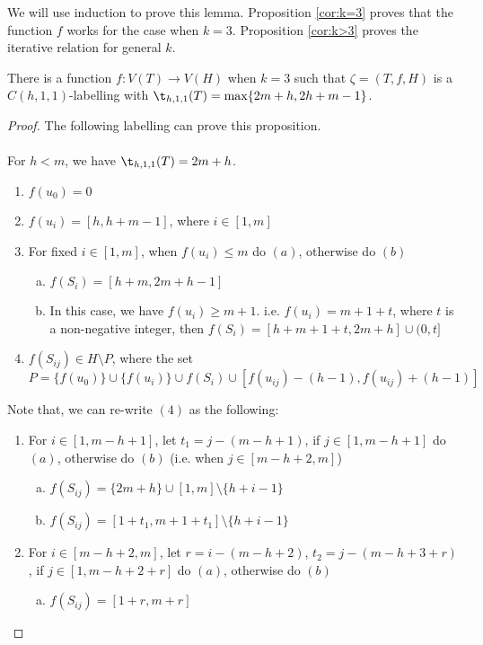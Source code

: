 We will use induction to prove this lemma. Proposition \ref{cor:k=3} proves that the function $f$ works for the case when $k = 3$. Proposition \ref{cor:k>3} proves the iterative relation for general $k$. 
\begin{proposition}
\label{cor:k=3}
There is a function $f: V(T) \rightarrow V(H)$ when $k = 3$ such that $\zeta = (T, f, H)$ is a $C(h,1,1)$-labelling with $\t_{h,1,1}(T) =\max\{2m+h, 2h+m-1\}$. 
\end{proposition}
\begin{proof} 
The following labelling can prove this proposition.  
\\
\\
For $h < m$, we have $\t_{h,1,1}(T) = 2m+h$. 
\begin{enumerate}[(1)]
\item $f(u_0) = 0$ 
\item $f(u_i) = [h, h+m-1]$, where $i \in [1,m]$ 
\item For fixed $i \in [1,m]$, when $f(u_i) \le m$ do $(a)$, otherwise do $(b)$
\begin{enumerate}[(a)]
\item $f(S_i) = [h+m, 2m+h-1]$
\item In this case, we have $f(u_i) \ge m+1$. i.e. $f(u_i) = m+1+t$, where $t$ is a non-negative integer, then $f(S_i) = [h+m+1+t, 2m+h] \cup (0, t]$
\end{enumerate}
\item $f(S_{ij}) \in H \setminus P$, where the set $P =  \{f(u_0)\} \cup \{f(u_i)\} \cup f(S_i) \cup [f(u_{ij}) - (h-1), f(u_{ij}) + (h-1)]$
\end{enumerate}
Note that, we can re-write $(4)$ as the following:
\begin{enumerate}[(4.1)]
\item For $i \in [1,m-h+1]$, let $t_1 = j - (m-h+1)$, if $j \in [1,m-h+1]$ do $(a)$, otherwise do $(b)$ (i.e. when $ j \in [m-h+2, m]$)
\begin{enumerate}[(a)]
\item $f(S_{ij}) = \{2m+h\} \cup [1,m] \setminus \{h+i-1\}$
\item $f(S_{ij}) = [1+t_1,   m+1+t_1] \setminus \{h+i-1\}$
\end{enumerate}
\item For $i \in [m-h+2, m]$, let $r = i - (m-h+2)$, $t_2 = j - (m-h+3+r)$, if $j \in [1, m-h+2+r]$ do $(a)$, otherwise do $(b)$
\begin{enumerate}[(a)]
\item $f(S_{ij}) = [1+r, m+r]$

\end{enumerate}
\end{enumerate}
\end{proof}
